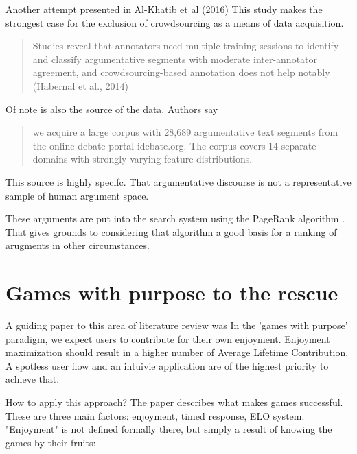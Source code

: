 \documentclass{report}
\begin{document}
Another attempt presented in Al-Khatib et al (2016) \cite{al-khatib_cross-domain_2016}
This study makes the strongest case for the exclusion of crowdsourcing as a means of data acquisition.
\begin{quote}
 Studies reveal that annotators need multiple training sessions to identify and classify argumentative segments with moderate inter-annotator agreement, and crowdsourcing-based annotation does not help notably (Habernal et al., 2014)
\end{quote}
Of note is also the source of the data. Authors say
\begin{quote}
 we acquire a large corpus with 28,689 argumentative text segments from the online debate portal idebate.org. The corpus covers 14 separate domains with strongly varying feature distributions.
\end{quote}
This source is highly specifc. That argumentative discourse is not a representative sample of human argument space.  

These arguments are put into the search system using the PageRank algorithm \cite{brin_anatomy_1998}.  That gives grounds to considering that algorithm a good basis for a ranking of arugments in other circumstances.

\section{Games with purpose to the rescue}
A guiding paper to this area of literature review was \cite{von_ahn_designing_2008} 
In the 'games with purpose' paradigm, we expect users to contribute for their own enjoyment. Enjoyment maximization should result in a higher number of Average Lifetime Contribution.  A spotless user flow and an intuivie application are of the highest priority to achieve that.

How to apply this approach? The paper describes what makes games successful.
These are three main factors: enjoyment, timed response, ELO system.
"Enjoyment" is not defined formally there, but simply a result of knowing the games by their fruits:
\end{document}
